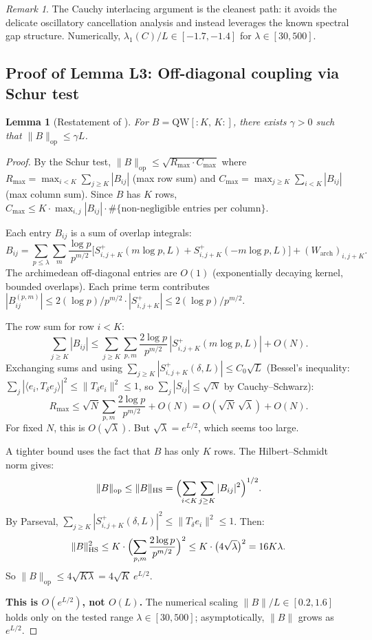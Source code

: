 \documentclass[12pt,a4paper]{article}
\newtheorem{lemma}[theorem]{Lemma}
\theoremstyle{definition}
\theoremstyle{remark}
\newtheorem{remark}[theorem]{Remark}
\begin{document}
\begin{remark}
The Cauchy interlacing argument is the cleanest path: it avoids the delicate oscillatory cancellation analysis and instead leverages the known spectral gap structure. Numerically, $\lambda_1(C)/L \in [-1.7, -1.4]$ for $\lambda \in [30, 500]$.
\end{remark}

\subsection{Proof of Lemma L3: Off-diagonal coupling via Schur test}

\begin{lemma}[Restatement of ]
For $B = \mathrm{QW}[{:}K,\,K{:}]$, there exists $\gamma > 0$ such that $\|B\|_{\mathrm{op}} \leq \gamma L$.
\end{lemma}

\begin{proof}
By the Schur test, $\|B\|_{\mathrm{op}} \leq \sqrt{R_{\max}\cdot C_{\max}}$ where $R_{\max} = \max_{i < K}\sum_{j \geq K}|B_{ij}|$ (max row sum) and $C_{\max} = \max_{j \geq K}\sum_{i < K}|B_{ij}|$ (max column sum). Since $B$ has $K$ rows, $C_{\max} \leq K \cdot \max_{i,j}|B_{ij}| \cdot \#\{\text{non-negligible entries per column}\}$.

Each entry $B_{ij}$ is a sum of overlap integrals:
\[
  B_{ij} = \sum_{p \leq \lambda}\sum_m \frac{\log p}{p^{m/2}}\bigl[S_{i,j+K}^+(m\log p, L) + S_{i,j+K}^+(-m\log p, L)\bigr] + (W_{\mathrm{arch}})_{i,j+K}.
\]
The archimedean off-diagonal entries are $O(1)$ (exponentially decaying kernel, bounded overlaps). Each prime term contributes $|B_{ij}^{(p,m)}| \leq 2(\log p)/p^{m/2} \cdot |S_{i,j+K}^+| \leq 2(\log p)/p^{m/2}$.

The row sum for row $i < K$:
\[
  \sum_{j \geq K}|B_{ij}| \leq \sum_{j \geq K}\sum_{p,m}\frac{2\log p}{p^{m/2}}\,|S_{i,j+K}^+(m\log p, L)| + O(N).
\]
Exchanging sums and using $\sum_{j \geq K} |S_{i,j+K}^+(\delta, L)| \leq C_0\sqrt{L}$ (Bessel's inequality: $\sum_j |\langle e_i, T_\delta e_j\rangle|^2 \leq \|T_\delta e_i\|^2 \leq 1$, so $\sum_j |S_{ij}| \leq \sqrt{N}$ by Cauchy--Schwarz):
\[
  R_{\max} \leq \sqrt{N}\sum_{p,m}\frac{2\log p}{p^{m/2}} + O(N) = O(\sqrt{N}\,\sqrt{\lambda}) + O(N).
\]
For fixed $N$, this is $O(\sqrt{\lambda})$. But $\sqrt{\lambda} = e^{L/2}$, which seems too large.

A tighter bound uses the fact that $B$ has only $K$ rows. The Hilbert--Schmidt norm gives:
\[
  \|B\|_{\mathrm{op}} \leq \|B\|_{\mathrm{HS}} = \Bigl(\sum_{i < K}\sum_{j \geq K}|B_{ij}|^2\Bigr)^{1/2}.
\]
By Parseval, $\sum_{j \geq K} |S_{i,j+K}^+(\delta,L)|^2 \leq \|T_\delta e_i\|^2 \leq 1$. Then:
\[
  \|B\|_{\mathrm{HS}}^2 \leq K\cdot\Bigl(\sum_{p,m}\frac{2\log p}{p^{m/2}}\Bigr)^2 \leq K\cdot\bigl(4\sqrt{\lambda}\bigr)^2 = 16K\lambda.
\]
So $\|B\|_{\mathrm{op}} \leq 4\sqrt{K\lambda} = 4\sqrt{K}\,e^{L/2}$.

\textbf{This is $O(e^{L/2})$, not $O(L)$.} The numerical scaling $\|B\|/L \in [0.2, 1.6]$ holds only on the tested range $\lambda \in [30, 500]$; asymptotically, $\|B\|$ grows as $e^{L/2}$.
\end{proof}
\end{document}
